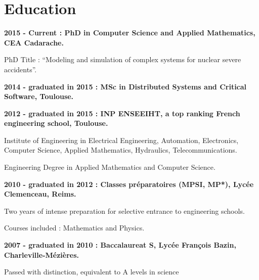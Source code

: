 \documentclass{article}
\renewenvironment{itemize}{
  \begin{list}{}{
      \setlength{\leftmargin}{1.5em}
      \setlength{\itemsep}{0.25em}
      \setlength{\parskip}{0pt}
      \setlength{\parsep}{0.25em}
    }
}{
  \end{list}
}
\begin{document}
\section*{Education}
\begin{itemize}
  	\item \textbf{2015 - Current : PhD in Computer Science and Applied Mathematics, CEA Cadarache.}
		\begin{itemize}
			\item PhD Title : ``Modeling and simulation of complex systems for nuclear severe accidents''.
		\end{itemize}
	\item \textbf{2014 - graduated in 2015 : MSc in Distributed Systems and Critical Software, Toulouse.}
    	\item \textbf{2012 - graduated in 2015 : INP ENSEEIHT, a top ranking French engineering school, Toulouse.}
		\begin{itemize}
			\item Institute of Engineering in Electrical Engineering, Automation, Electronics, Computer Science, Applied Mathematics, Hydraulics, Telecommunications.
			\item Engineering Degree in Applied Mathematics and Computer Science.
		\end{itemize}
	\item \textbf{2010 - graduated in 2012 : Classes préparatoires (MPSI, MP*), Lycée Clemenceau, Reims.}
		\begin{itemize}
			\item Two years of intense preparation for selective entrance to engineering schools.
			\item Courses included : Mathematics and Physics.
		\end{itemize}
	\item \textbf{2007 - graduated in 2010 : Baccalaureat S, Lycée François Bazin, Charleville-Mézières.}
		\begin{itemize}
			\item Passed with distinction, equivalent to A levels in science
		\end{itemize}
\end{itemize}
\end{document}
